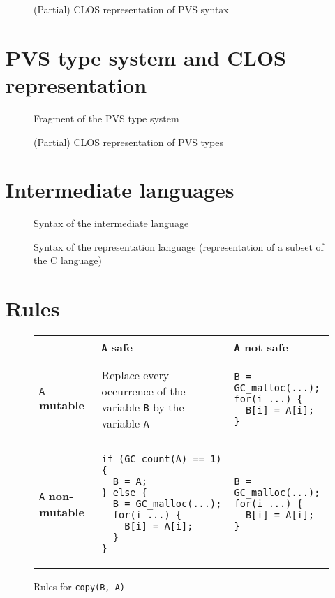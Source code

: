 \documentclass[12pt,a4paper]{article}
\newcommand{\cl}[1]{\texttt{#1}}
\newcommand{\mut}{  \textbf{ mutable } }
\newcommand{\nmut}{ \textbf{ non-mutable } }
\newcommand{\safe}{ \textbf{ safe } }
\begin{document}
\begin{figure}[!ht]

\caption{(Partial) CLOS representation of PVS syntax}
\label{fig:PVS-CLOS}
\end{figure}

\newpage
\section{PVS type system and CLOS representation}

\begin{figure}[!ht]

\caption{Fragment of the PVS type system}
\label{fig:PVS-types}
\end{figure}


\begin{figure}[!ht]

\caption{(Partial) CLOS representation of PVS types}
\label{fig:PVS-CLOS-types}
\end{figure}


\newpage
\section{Intermediate languages}

\begin{figure}[!ht]

\caption{Syntax of the intermediate language}
\label{fig:aux-syntax}
\end{figure}

\newpage
\begin{figure}[!ht]

\caption{Syntax of the representation language (representation of a subset of the C language)}
\label{fig:Csyntax}
\end{figure}



\newpage
\section{Rules}
\label{Rules}


\begin{figure}[!ht]
\begin{tabular}{|p{5.5cm}|p{5.5cm}|p{6cm}|}
\hline
             & \cl{A} \safe & \cl{A} not \safe \\ \hline
\cl{A} \mut  & Replace every occurrence of the variable \cl{B} by the variable \cl{A} & \begin{lstlisting}
B = GC_malloc(...);
for(i ...) {
  B[i] = A[i];
}
\end{lstlisting} \\ \hline
\cl{A} \nmut & \begin{lstlisting}
if (GC_count(A) == 1) {
  B = A;
} else {
  B = GC_malloc(...);
  for(i ...) {
    B[i] = A[i];
  }
}
\end{lstlisting} & \begin{lstlisting}
B = GC_malloc(...);
for(i ...) {
  B[i] = A[i];
}
\end{lstlisting} \\ \hline
\end{tabular}
\caption{Rules for \cl{copy(B, A)}}
\end{figure}
\end{document}
